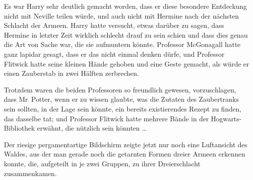 Es war Harry sehr deutlich gemacht worden, dass er diese besondere Entdeckung nicht mit Neville teilen würde, und auch nicht mit Hermine nach der nächsten Schlacht der Armeen. Harry hatte versucht, etwas darüber zu sagen, dass Hermine in letzter Zeit wirklich schlecht drauf zu sein schien und dass dies genau die Art von Sache war, die sie aufmuntern könnte. Professor McGonagall hatte ganz lapidar gesagt, dass er das nicht einmal denken dürfe, und Professor Flitwick hatte seine kleinen Hände gehoben und eine Geste gemacht, als würde er einen Zauberstab in zwei Hälften zerbrechen.

Trotzdem waren die beiden Professoren so freundlich gewesen, vorzuschlagen, dass Mr~Potter, wenn er zu wissen glaubte, was die Zutaten des Zaubertranks sein sollten, in der Lage sein könnte, ein bereits existierendes Rezept zu finden, das dasselbe tat; und Professor Flitwick hatte mehrere Bände in der Hogwarts-Bibliothek erwähnt, die nützlich sein könnten …

\later

Der riesige pergamentartige Bildschirm zeigte jetzt nur noch eine Luftansicht des Waldes, aus der man gerade noch die getarnten Formen dreier Armeen erkennen konnte, die, aufgeteilt in je zwei Gruppen, zu ihrer Dreierschlacht zusammenkamen.

